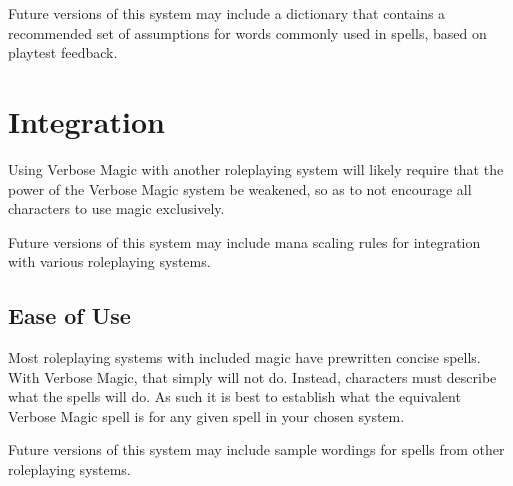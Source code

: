 \documentclass[10pt,a4paper,twocolumn,openany]{book}
\begin{document}
\begin{rpg-commentbox}
	Future versions of this system may include a dictionary that contains a recommended set of assumptions for words commonly used in spells, based on playtest feedback.
\end{rpg-commentbox}

\chapter{Integration}
Using Verbose Magic with another roleplaying system will likely require that the power of the Verbose Magic system be weakened, so as to not encourage all characters to use magic exclusively.

\begin{rpg-commentbox}
	Future versions of this system may include mana scaling rules for integration with various roleplaying systems.
\end{rpg-commentbox}

\section{Ease of Use}
Most roleplaying systems with included magic have prewritten concise spells.
With Verbose Magic, that simply will not do.
Instead, characters must describe what the spells will do.
As such it is best to establish what the equivalent Verbose Magic spell is for any given spell in your chosen system.

\begin{rpg-commentbox}
	Future versions of this system may include sample wordings for spells from other roleplaying systems.
\end{rpg-commentbox}
\end{document}
